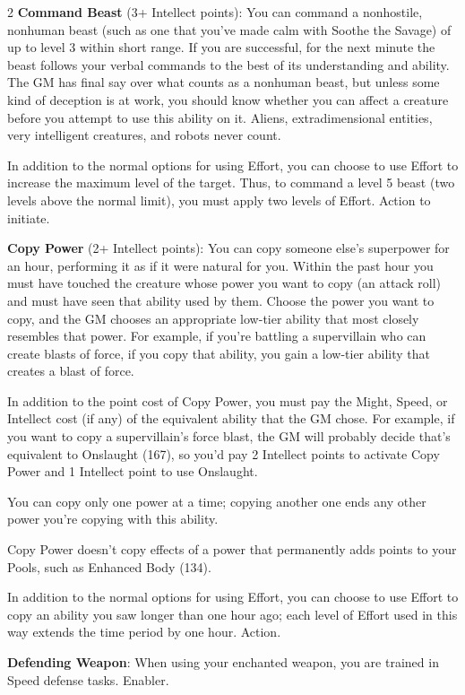 \begin{multicols}{2}
\textbf{Command Beast} (3+ Intellect points): You can command a nonhostile, nonhuman beast (such as one that you’ve made calm with Soothe the Savage) of up to level 3 within short range. If you are successful, for the next minute the beast follows your verbal commands to the best of its understanding and ability. The GM has final say over what counts as a nonhuman beast, but unless some kind of deception is at work, you should know whether you can affect a creature before you attempt to use this ability on it. Aliens, extradimensional entities, very intelligent creatures, and robots never count.

In addition to the normal options for using Effort, you can choose to use Effort to increase the maximum level of the target. Thus, to command a level 5 beast (two levels above the normal limit), you must apply two levels of Effort. Action to initiate.

\textbf{Copy Power} (2+ Intellect points): You can copy someone else’s superpower
for an hour, performing it as if it were natural for you. Within the past hour you must have touched the creature whose power you want to copy (an attack roll) and must have seen that ability used by them. Choose the power you want to copy, and the GM chooses an appropriate low-tier ability that most closely resembles that power. For example, if you’re battling a supervillain who can create blasts of force, if you copy that ability, you gain a low-tier ability that creates a blast of force.

In addition to the point cost of Copy Power, you must pay the Might, Speed, or Intellect cost (if any) of the equivalent ability that the GM chose. For example, if you want to copy a supervillain’s force blast, the GM will probably decide that’s equivalent to Onslaught (167), so you’d pay 2 Intellect points to activate Copy Power and 1 Intellect point to use Onslaught.

You can copy only one power at a time; copying another one ends any other power you’re copying with this ability.

Copy Power doesn’t copy effects of a power that permanently adds points to your Pools, such as Enhanced Body (134).

In addition to the normal options for using Effort, you can choose to use Effort to copy an ability you saw longer than one hour ago; each level of Effort used in this way extends the time period by one hour. Action.

\textbf{Defending Weapon}: When using your enchanted weapon, you are trained in Speed defense tasks. Enabler.


\end{multicols}

